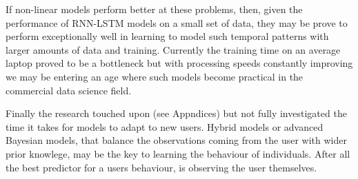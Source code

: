 If non-linear models perform better at these problems, then, given the performance of RNN-LSTM models on a small set of data, they may be prove to perform exceptionally well in learning to model such temporal patterns with larger amounts of data and training. Currently the training time on an average laptop proved to be a bottleneck but with processing speeds constantly improving we may be entering an age where such models become practical in the commercial data science field. 

Finally the research touched upon (see Appndices) but not fully investigated the time it takes for models to adapt to new users. Hybrid models or advanced Bayesian models, that balance the observations coming from the user with wider prior knowlege, may be the key to learning the behaviour of individuals. After all the best predictor for a users behaviour, is observing the user themselves.